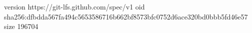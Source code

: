 version https://git-lfs.github.com/spec/v1
oid sha256:dfbdda567fa494c5653586716b662bf8573bfc0752d6ace320bd0bbb5fd46e57
size 196704
